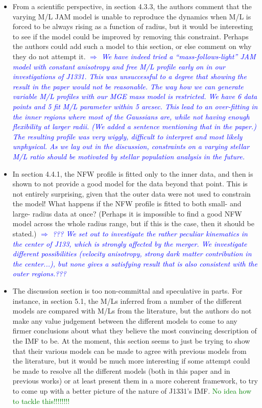 \documentclass[10pt,a4paper]{article}
\newcommand{\Comment}[1]{\textsl{\textcolor{Blue}{$\Longrightarrow$ {#1}}}}
\newcommand{\Glenn}[1]{\textcolor{Green}{#1}}
\begin{document}
\begin{itemize}
\item From a scientific perspective, in section 4.3.3, the authors comment that the
varying M/L JAM model is unable to reproduce the dynamics when M/L is forced to be
always rising as a function of radius, but it would be interesting to see if the
model could be improved by removing this constraint. Perhaps the authors could add
such a model to this section, or else comment on why they do not attempt it. \Comment{We have indeed tried a ``mass-follows-light'' JAM model with constant anisotropy and free M/L profile early on in our investigations of J1331. This was unsuccessful to a degree that showing the result in the paper would not be reasonable.  The way how we can generate variable M/L profiles with our MGE mass model is restricted. We have 6 data points and 5 fit M/L parameter within 5 arcsec. This lead to an over-fitting in the inner regions where most of the Gaussians are, while not having enough flexibility at larger radii. (We added a sentence mentioning that in the paper.) The resulting profile was very wiggly, difficult to interpret and most likely unphysical.  As we lay out in the discussion, constraints on a varying stellar M/L ratio should be motivated by stellar population analysis in the future.}

\item In section 4.4.1, the NFW profile is fitted only to the inner data, and then is
shown to not provide a good model for the data beyond that point. This is not
entirely surprising, given that the outer data were not used to constrain the model!
What happens if the NFW profile is fitted to both small- and large- radius data at
once? (Perhaps it is impossible to find a good NFW model across the whole radius
range, but if this is the case, then it should be stated.) \Comment{??? We set out to investigate the rather peculiar kinematics in the center of J133, which is strongly affected by the merger. We investigate different possibilities (velocity anisotropy, strong dark matter contribution in the center...), but none gives a satisfying result that is also consistent with the outer regions.??? }

\item The discussion section is too non-committal and speculative in parts. For instance,
in section 5.1, the M/Ls inferred from a number of the different models are compared
with M/Ls from the literature, but the authors do not make any value judgement
between the different models to come to any firmer conclusions about what they
believe the most convincing description of the IMF to be. At the moment, this
section seems to just be trying to show that their various models can be made to
agree with previous models from the literature, but it would be much more
interesting if some attempt could be made to resolve all the different models (both
in this paper and in previous works) or at least present them in a more coherent
framework, to try to come up with a better picture of the nature of J1331's IMF. \Glenn{No idea how to tackle this!!!!!!!!}


\end{itemize}
\end{document}
